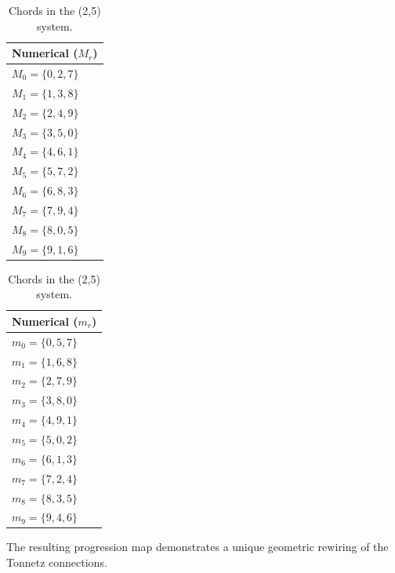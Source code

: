 \documentclass[11pt,letterpaper]{amsart}
\begin{document}
{\tiny \begin{table}[H]
    \centering
    \begin{minipage}{0.48\textwidth}
        \centering
        \begin{tabular}{l}
        \toprule
        \textbf{Numerical ($M_r$)} \\
        \midrule
        $M_0 = \{0, 2, 7\}$ \\
        $M_1 = \{1, 3, 8\}$ \\
        $M_2 = \{2, 4, 9\}$ \\
        $M_3 = \{3, 5, 0\}$ \\
        $M_4 = \{4, 6, 1\}$ \\
        $M_5 = \{5, 7, 2\}$ \\
        $M_6 = \{6, 8, 3\}$ \\
        $M_7 = \{7, 9, 4\}$ \\
        $M_8 = \{8, 0, 5\}$ \\
        $M_9 = \{9, 1, 6\}$ \\
        \bottomrule
        \end{tabular}
    \end{minipage}\hfill
    \begin{minipage}{0.48\textwidth}
        \centering
        \begin{tabular}{l}
        \toprule
        \textbf{Numerical ($m_r$)} \\
        \midrule
        $m_0 = \{0, 5, 7\}$ \\
        $m_1 = \{1, 6, 8\}$ \\
        $m_2 = \{2, 7, 9\}$ \\
        $m_3 = \{3, 8, 0\}$ \\
        $m_4 = \{4, 9, 1\}$ \\
        $m_5 = \{5, 0, 2\}$ \\
        $m_6 = \{6, 1, 3\}$ \\
        $m_7 = \{7, 2, 4\}$ \\
        $m_8 = \{8, 3, 5\}$ \\
        $m_9 = \{9, 4, 6\}$ \\
        \bottomrule
        \end{tabular}
    \end{minipage}
    \caption{Chords in the (2,5) system.}
\end{table}}

The resulting progression map demonstrates a unique geometric rewiring of the Tonnetz connections.
\end{document}
